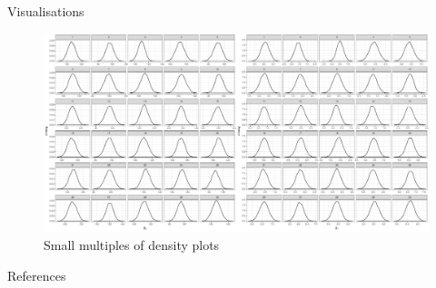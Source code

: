 {\begin{columns}
\begin{column}[t]{0.45\linewidth}
\begin{block}{Visualisations}
\begin{figure}
	\includegraphics[width=0.8\linewidth]{winbugs}
	\caption{Small multiples of density plots}
\end{figure}


\end{block}

\begin{block}{References}
\setlength{\parskip}{15pt}

\footnotesize




\end{block}
 \end{column}
\end{columns}

}

